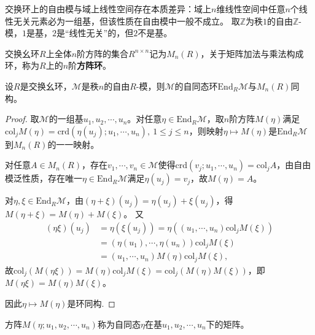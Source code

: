 \documentclass[../../main.tex]{subfiles}%
\begin{document}
\begin{example}
交换环上的自由模与域上线性空间存在本质差异：域上$n$维线性空间中任意$n$个线性无关元素必为一组基，但该性质在自由模中一般不成立。
取$\mathbb Z$为秩$1$的自由$\mathbb Z$-模，$1$是基，$2$是“线性无关”的，但$2$不是基。
\end{example}

\begin{definition}
交换幺环$R$上全体$n$阶方阵的集合$R^{n\times n}$记为$M_n(R)$，关于矩阵加法与乘法构成环，称为$R$上的$n$阶\textbf{方阵环}。
\end{definition}

\begin{theorem}
设$R$是交换幺环，$\mathscr{M}$是秩$n$的自由$R$-模，则$\mathscr{M}$的自同态环$\mathrm{End}_R\mathscr{M}$与$M_n(R)$同构。
\end{theorem}

\begin{proof}

取$\mathscr{M}$的一组基$u_1,u_2,\cdots,u_n$。对任意$\eta\in\mathrm{End}_R\mathscr{M}$，取$n$阶方阵$M(\eta)$满足$\mathrm{col}_j M(\eta)=\mathrm{crd}(\eta(u_j);u_1,\cdots,u_n),\ 1\leqslant j\leqslant n$，则映射$\eta\mapsto M(\eta)$是$\mathrm{End}_R\mathscr{M}$到$M_n(R)$的一一映射。

对任意$A\in M_n(R)$，存在$v_1,\cdots,v_n\in\mathscr{M}$使得$\mathrm{crd}(v_j;u_1,\cdots,u_n)=\mathrm{col}_j A$，由自由模泛性质，存在唯一$\eta\in\mathrm{End}_R\mathscr{M}$满足$\eta(u_j)=v_j$，故$M(\eta)=A$。

对$\eta,\xi\in\mathrm{End}_R\mathscr{M}$，由$(\eta+\xi)(u_j)=\eta(u_j)+\xi(u_j)$，得$M(\eta+\xi)=M(\eta)+M(\xi)$。
又
\begin{align*}
(\eta\xi)(u_j)&=\eta(\xi(u_j))=\eta\left((u_1,\cdots,u_n)\mathrm{col}_j M(\xi)\right)\\
&=(\eta(u_1),\cdots,\eta(u_n))\mathrm{col}_j M(\xi)\\
&=(u_1,\cdots,u_n)M(\eta)\mathrm{col}_j M(\xi),
\end{align*}
故$\mathrm{col}_j(M(\eta\xi))=M(\eta)\mathrm{col}_j M(\xi)=\mathrm{col}_j(M(\eta)M(\xi))$，即$M(\eta\xi)=M(\eta)M(\xi)$。

因此$\eta\mapsto M(\eta)$是环同构.

\end{proof}

\begin{remark}
方阵$M(\eta;u_1,u_2,\cdots,u_n)$称为自同态$\eta$在基$u_1,u_2,\cdots,u_n$下的矩阵。
\end{remark}
\end{document}
